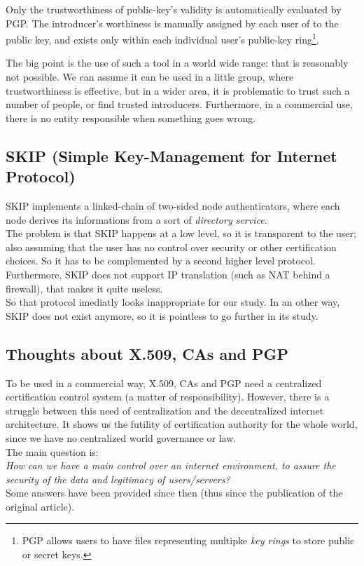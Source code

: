 \documentclass[journal, a4paper]{IEEEtran}
\begin{document}
Only the trustworthiness of public-key's validity is automatically evaluated by PGP. The introducer's worthiness is manually assigned by each user of to the public key, and exists only within each individual user's public-key ring\footnote{PGP allows users to have files representing multipke \textit{key rings} to store public or secret keys\cite{caronni2000}.}.

The big point is the use of such a tool in a world wide range: that is reasonably not possible. We can assume it can be used in a little group, where trustworthiness is effective, but in a wider area, it is problematic to trust such a number of people, or find trusted introducers. Furthermore, in a commercial use, there is no entity responsible when something goes wrong.


\subsection{SKIP (Simple Key-Management for Internet Protocol)}
\label{skip}

SKIP implements a linked-chain of two-sided node authenticators, where each node derives its informations from a sort of \textit{directory service}.\\
The problem is that SKIP happens at a low level, so it is transparent to the user; also assuming that the user has no control over security or other certification choices. So it has to be complemented by a second higher level protocol. Furthermore, SKIP does not support IP translation (such as NAT behind a firewall), that makes it quite useless.\\
So that protocol imediatly looks inappropriate for our study. In an other way, SKIP does not exist anymore, so it is pointless to go further in its study.


\subsection{Thoughts about X.509, CAs and PGP}
\label{thoughts_old}

To be used in a commercial way, X.509, CAs and PGP need a centralized certification control system (a matter of responsibility).
However, there is a struggle between this need of centralization and the decentralized internet architecture.
It shows us the futility of certification authority for the whole world, since we have no centralized world governance or law.\\
The main question is:\\
\textit{How can we have a main control over an internet environment, to assure the security of the data and legitimacy of users/servers?}\\
Some answers have been provided since then (thus since the publication of the original article).
\end{document}
